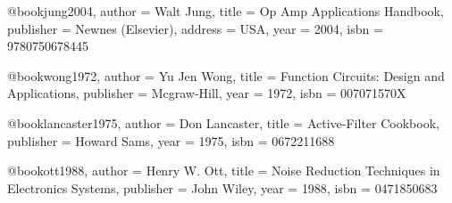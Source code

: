@book{jung2004,
  author = {Walt Jung},
  title = {Op Amp Applications Handbook},
  publisher = {Newnes (Elsevier)},
  address = {USA},
  year = {2004},
  isbn = {9780750678445}
}

@book{wong1972,
  author = {Yu Jen Wong},
  title = {Function Circuits: Design and Applications},
  publisher = {Mcgraw-Hill},
  year = {1972},
  isbn = {007071570X}
}

@book{lancaster1975,
  author = {Don Lancaster},
  title = {Active-Filter Cookbook},
  publisher = {Howard Sams},
  year = {1975},
  isbn = {0672211688}
}

@book{ott1988,
  author = {Henry W. Ott},
  title = {Noise Reduction Techniques in Electronics Systems},
  publisher = {John Wiley},
  year = {1988},
  isbn = {0471850683}
} 
